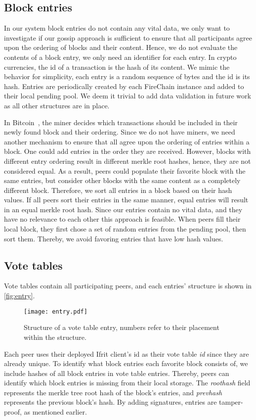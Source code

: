 \documentclass[USenglish]{uit-thesis}
\begin{document}
\subsection{Block entries}
In our system block entries do not contain any vital data, we only want to investigate if our gossip approach is sufficient to ensure that all participants agree upon the ordering of blocks and their content.
Hence, we do not evaluate the contents of a block entry, we only need an identifier for each entry.
In crypto currencies, the id of a transaction is the hash of its content.
We mimic the behavior for simplicity, each entry is a random sequence of bytes and the id is its hash.
Entries are periodically created by each FireChain instance and added to their local pending pool. 
We deem it trivial to add data validation in future work as all other structures are in place.

In Bitcoin~\cite{bitcoin}, the miner decides which transactions should be included in their newly found block and their ordering.
Since we do not have miners, we need another mechanism to ensure that all agree upon the ordering of entries within a block.
One could add entries in the order they are received.
However, blocks with different entry ordering result in different merkle root hashes, hence, they are not considered equal.
As a result, peers could populate their favorite block with the same entries, but consider other blocks with the same content as a completely different block.
Therefore, we sort all entries in a block based on their hash values.
If all peers sort their entries in the same manner, equal entries will result in an equal merkle root hash.
Since our entries contain no vital data, and they have no relevance to each other this approach is feasible.
When peers fill their local block, they first chose a set of random entries from the pending pool, then sort them.
Thereby, we avoid favoring entries that have low hash values.

\subsection{Vote tables}
Vote tables contain all participating peers, and each entries' structure is shown in \autoref{fig:entry}.
\begin{figure}[h]
	\centering
	\texttt{[image: entry.pdf]}
	\caption{Structure of a vote table entry, numbers refer to their placement within the structure.}
	\label{fig:entry}
\end{figure}
Each peer uses their deployed Ifrit client's id as their vote table \textit{id} since they are already unique.
To identify what block entries each favorite block consists of, we include hashes of all block entries in vote table entries.
Thereby, peers can identify which block entries is missing from their local storage.
The \textit{roothash} field represents the merkle tree root hash of the block's entries, and \textit{prevhash} represents the previous block's hash.
By adding signatures, entries are tamper-proof, as mentioned earlier.
\end{document}
